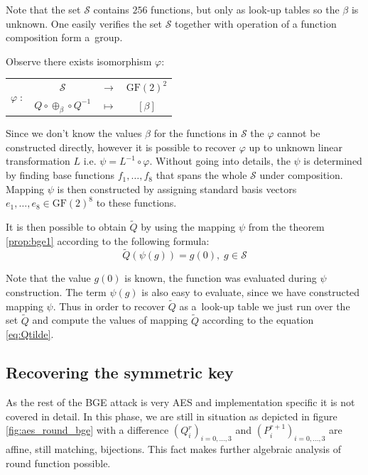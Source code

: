 \documentclass[11pt,oneside,final]{fithesis2}
\newcommand{\gf}{\ensuremath{\text{GF}\left(2\right)}}
\begin{document}
    Note that the set $\mathcal{S}$ contains $256$ functions, but only as look-up tables so the $\beta$ is unknown. One easily verifies the set
    $\mathcal{S}$ together with operation of a function composition form a~group. 
    
    Observe there exists isomorphism $\varphi:\; $
    
    \begin{center}
    \begin{tabular}{ r  c c c }
	\multirow{2}{*}{$\varphi \; :$} & $\mathcal{S}$  & $\longrightarrow$ & $\gf^2$ \\
	                                & $Q \circ \oplus_{\beta} \circ Q^{-1} $ & $\longmapsto$ & $\left[ \beta \right]$
	
    \end{tabular}
    \end{center}
    
    Since we don't know the values $\beta$ for the functions in $\mathcal{S}$ the $\varphi$ cannot be constructed directly, however it is possible to 
    recover $\varphi$ up to unknown linear transformation $L$ i.e. $\psi = L^{-1} \circ \varphi$. Without going into details, the 
    $\psi$ is determined by finding base functions $f_1,\dots,f_8$ that spans the whole $\mathcal{S}$ under composition. Mapping $\psi$ is then constructed by assigning
    standard basis vectors $e_1,\dots,e_8 \in \gf^8$ to these functions.
    
    It is then possible to obtain $\widetilde{Q}$ by using the mapping $\psi$ from the theorem \ref{prop:bge1} according to the following formula:
    \begin{equation}\label{eq:Qtilde}
     \widetilde{Q}\left(\psi\left(g\right)\right) = g\left(0\right),\; g \in \mathcal{S}
    \end{equation}
    
    Note that the value $g\left(0\right)$ is known, the function was evaluated during $\psi$ construction. The term $\psi\left(g\right)$ is also easy to
    evaluate, since we have constructed mapping $\psi$. Thus in order to recover $\widetilde{Q}$ as a~look-up table we just run over the set $\widetilde{Q}$
    and compute the values of mapping $\widetilde{Q}$ according to the equation \ref{eq:Qtilde}.
    
    \subsection{Recovering the symmetric key}
    As the rest of the BGE attack is very AES and implementation specific it is not covered in detail. In this phase, we are still in situation as
    depicted in figure \ref{fig:aes_round_bge} with a difference $\left(Q^r_i\right)_{i=0,\dots,3}$ and $\left(P^{r+1}_i\right)_{i=0,\dots,3}$
    are affine, still matching, bijections. This fact makes further algebraic analysis of round function possible.
    
\end{document}

